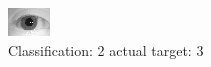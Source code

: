 \begin{figure}[h!]
\begin{center}
\includegraphics[width=0.60\columnwidth]{figures/ID1110_class_2_target_3.png}
\end{center}
\caption{ Classification: 2 actual target: 3}
\label{fig:ID1110_class_2_target_3}
\end{figure}
